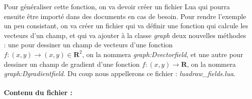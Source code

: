 Pour généraliser cette fonction, on va devoir créer un fichier Lua qui pourra ensuite être importé dans des documents en cas de besoin. Pour rendre l'exemple un peu consistant, on va créer un fichier qui va définir une fonction qui calcule les vecteurs d'un champ, et qui va ajouter à la classe \emph{graph} deux nouvelles méthodes : une pour dessiner un champ de vecteurs d'une fonction $f\colon(x,y)\to(x,y)\in \mathbf R^2$, on la nommera \emph{graph:Dvectorfield}, et une autre pour dessiner un champ de gradient d'une fonction $f\colon(x,y)\to\mathbf R$, on la nommera \emph{graph:Dgradientfield}. Du coup nous appellerons ce fichier : \emph{luadraw\_fields.lua}.

\paragraph{Contenu du fichier :}

